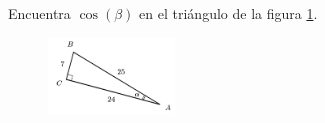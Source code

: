 Encuentra $\cos(\beta)$ en el triángulo de la figura \ref{fig:functrig06}.
\begin{figure}[H]
    \begin{center}
        \includegraphics[width=0.3\textwidth]{../images/functrig06.png}
    \end{center}
    \caption{}
    \label{fig:functrig06}
\end{figure}
